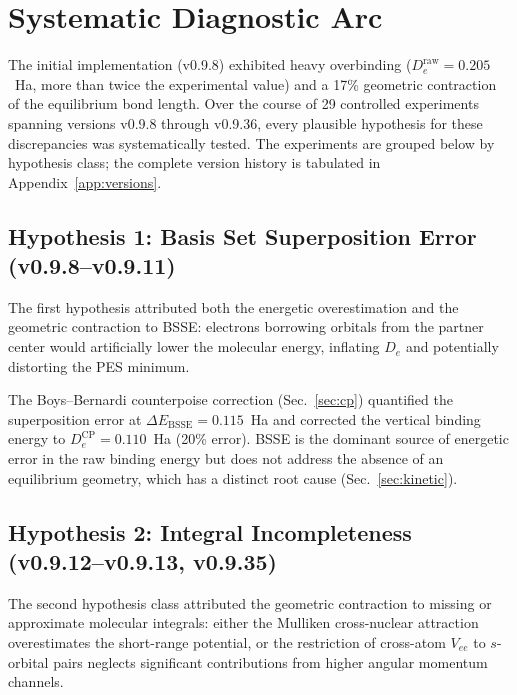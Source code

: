 \documentclass[aps,pra,twocolumn,superscriptaddress,longbibliography]{revtex4-2}
\begin{document}
\section{Systematic Diagnostic Arc}
\label{sec:diagnostic}

The initial implementation (v0.9.8) exhibited heavy overbinding
($D_e^{\mathrm{raw}} = 0.205$~Ha, more than twice the experimental
value) and a 17\% geometric contraction of the equilibrium bond length.
Over the course of 29 controlled experiments spanning versions v0.9.8
through v0.9.36, every plausible hypothesis for these discrepancies was
systematically tested.  The experiments are grouped below by hypothesis
class; the complete version history is tabulated in
Appendix~\ref{app:versions}.

\subsection{Hypothesis 1: Basis Set Superposition Error
(v0.9.8--v0.9.11)}
\label{sec:hyp_bsse}

The first hypothesis attributed both the energetic overestimation and
the geometric contraction to BSSE: electrons borrowing orbitals from the
partner center would artificially lower the molecular energy, inflating
$D_e$ and potentially distorting the PES minimum.

The Boys--Bernardi counterpoise correction (Sec.~\ref{sec:cp})
quantified the superposition error at
$\Delta E_{\mathrm{BSSE}} = 0.115$~Ha and corrected the vertical
binding energy to $D_e^{\mathrm{CP}}=0.110$~Ha (20\% error).  BSSE
is the dominant source of energetic error in the raw binding energy
but does not address the absence of an equilibrium geometry, which
has a distinct root cause (Sec.~\ref{sec:kinetic}).

\subsection{Hypothesis 2: Integral Incompleteness
(v0.9.12--v0.9.13, v0.9.35)}
\label{sec:hyp_integrals}

The second hypothesis class attributed the geometric contraction to
missing or approximate molecular integrals: either the Mulliken
cross-nuclear attraction overestimates the short-range potential, or the
restriction of cross-atom $V_{ee}$ to $s$-orbital pairs neglects
significant contributions from higher angular momentum channels.
\end{document}
